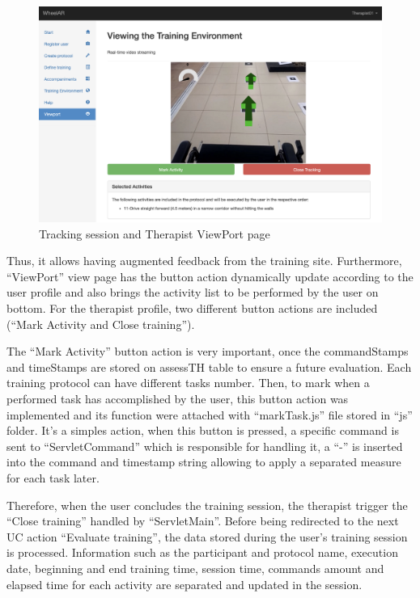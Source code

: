 \begin{figure}[!hbt]
\begin{center}
\includegraphics[width=1\linewidth]{img/cap5/tViewPortTherapist}
\caption{Tracking session and Therapist ViewPort page} \label{fig:ViewPortTherapist}
\end{center}
\end{figure}


Thus, it allows having augmented feedback from the training site. Furthermore, ``ViewPort'' view page has the button action dynamically update according to the user profile and also brings the activity list to be performed by the user on bottom. For the therapist profile, two different button actions are included (``Mark Activity and Close training''). 

The ``Mark Activity'' button action is very important, once the commandStamps and timeStamps are stored on assessTH table to ensure a future evaluation. Each training protocol can have different tasks number. Then, to mark when a performed task has accomplished by the user, this button action was implemented and its function were attached with ``markTask.js'' file stored in ``js'' folder. It's a simples action, when this button is pressed, a specific command is sent to ``ServletCommand'' which is responsible for handling it, a ``-'' is inserted into the command and timestamp string allowing to apply a separated measure for each task later. 

Therefore, when the user concludes the training session, the therapist trigger the ``Close training'' handled by ``ServletMain''. Before being redirected to the next UC action ``Evaluate training'', the data stored during the user's training session is processed. Information such as the participant and protocol name, execution date, beginning and end training time, session time, commands amount and elapsed time for each activity are separated and updated in the session.

